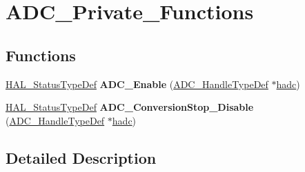 \hypertarget{group___a_d_c___private___functions}{\section{A\-D\-C\-\_\-\-Private\-\_\-\-Functions}
\label{group___a_d_c___private___functions}
}
\subsection*{Functions}
\begin{DoxyCompactItemize}
\item 
\hypertarget{group___a_d_c___private___functions_ga034b9253bac7f083ec43b5b09873ebf1}{\hyperlink{stm32l1xx__hal__def_8h_a63c0679d1cb8b8c684fbb0632743478f}{H\-A\-L\-\_\-\-Status\-Type\-Def} {\bfseries A\-D\-C\-\_\-\-Enable} (\hyperlink{struct_a_d_c___handle_type_def}{A\-D\-C\-\_\-\-Handle\-Type\-Def} $\ast$\hyperlink{stm32l1xx__it_8c_a62fcafba91cf315db7e0e0c8f22c656f}{hadc})}\label{group___a_d_c___private___functions_ga034b9253bac7f083ec43b5b09873ebf1}

\item 
\hypertarget{group___a_d_c___private___functions_ga646e302bd6f80b1a063f31b556806630}{\hyperlink{stm32l1xx__hal__def_8h_a63c0679d1cb8b8c684fbb0632743478f}{H\-A\-L\-\_\-\-Status\-Type\-Def} {\bfseries A\-D\-C\-\_\-\-Conversion\-Stop\-\_\-\-Disable} (\hyperlink{struct_a_d_c___handle_type_def}{A\-D\-C\-\_\-\-Handle\-Type\-Def} $\ast$\hyperlink{stm32l1xx__it_8c_a62fcafba91cf315db7e0e0c8f22c656f}{hadc})}\label{group___a_d_c___private___functions_ga646e302bd6f80b1a063f31b556806630}

\end{DoxyCompactItemize}


\subsection{Detailed Description}
